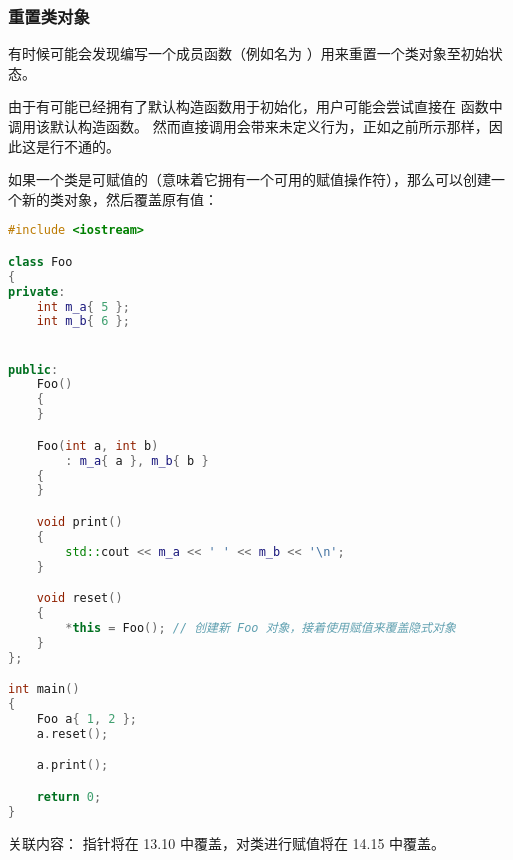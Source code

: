 \documentclass[../../LearnCpp.tex]{subfiles}
\begin{document}
\subsubsection*{重置类对象}

有时候可能会发现编写一个成员函数（例如名为 ）用来重置一个类对象至初始状态。

由于有可能已经拥有了默认构造函数用于初始化，用户可能会尝试直接在  函数中调用该默认构造函数。
然而直接调用会带来未定义行为，正如之前所示那样，因此这是行不通的。

如果一个类是可赋值的（意味着它拥有一个可用的赋值操作符），那么可以创建一个新的类对象，然后覆盖原有值：

\begin{lstlisting}[language=C++]
#include <iostream>

class Foo
{
private:
    int m_a{ 5 };
    int m_b{ 6 };


public:
    Foo()
    {
    }

    Foo(int a, int b)
        : m_a{ a }, m_b{ b }
    {
    }

    void print()
    {
        std::cout << m_a << ' ' << m_b << '\n';
    }

    void reset()
    {
        *this = Foo(); // 创建新 Foo 对象，接着使用赋值来覆盖隐式对象
    }
};

int main()
{
    Foo a{ 1, 2 };
    a.reset();

    a.print();

    return 0;
}
\end{lstlisting}

关联内容： 指针将在 13.10 中覆盖，对类进行赋值将在 14.15 中覆盖。
\end{document}

